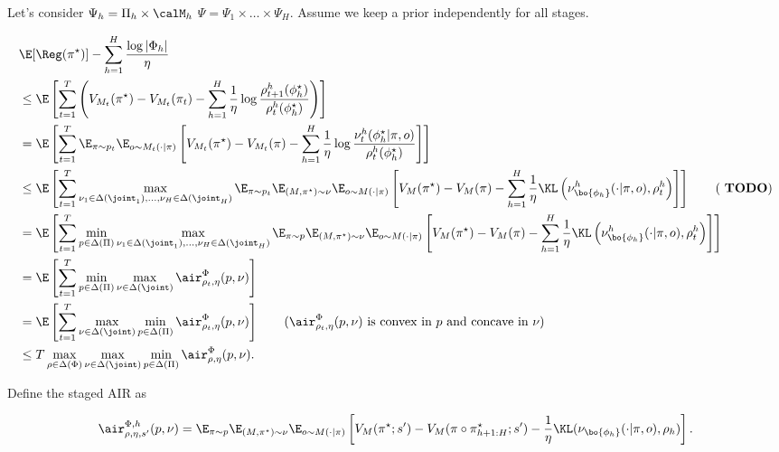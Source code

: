 Let's consider $\Psi_h = \Pi_h\times\calM_h$
$\Psi = \Psi_1\times\dots\times\Psi_H$.
Assume we keep a prior independently for all stages.

\begin{align*}
       &\E[\Reg(\pi^\star)] - \sum_{h=1}^H\frac{\log|\Phi_h|}{\eta} \\
       &\leq \E\left[\sum_{t=1}^T \left(V_{M_t}(\pi^\star) -  V_{M_t}(\pi_t) - \sum_{h=1}^H\frac{1}{\eta}\log\frac{\rho^h_{t+1}(\phi^\star_h)}{\rho^h_t(\phi^\star_h)} \right)\right] \\
       &= \E\left[\sum_{t=1}^T  \E_{\pi\sim p_t} \E_{o\sim M_t(\cdot|\pi)}\left[ V_{M_t}(\pi^\star) -  V_{M_t}(\pi) - \sum_{h=1}^H\frac{1}{\eta} \log\frac{\nu_t^h(\phi^\star_h|\pi, o)}{\rho_t^h(\phi^\star_h)} \right]\right] \\
       &\leq \E\left[ \sum_{t=1}^T  \max_{\nu_1\in\Delta(\joint_1),\dots,\nu_H\in\Delta(\joint_H)} \E_{\pi\sim p_t} \E_{(M,\pi^\star)\sim \nu} \E_{o\sim M(\cdot|\pi)}\left[ V_{M}(\pi^\star) -  V_{M}(\pi) - \sum_{h=1}^H\frac{1}{\eta} \KL\left( \nu^h_{\bo{\phi_h}}(\cdot|\pi, o), \rho^h_t\right) \right]\right]  \tag{ \textbf{TODO}}  \\
       &= \E\left[ \sum_{t=1}^T  \min_{p\in\Delta(\Pi)}\max_{\nu_1\in\Delta(\joint_1),\dots,\nu_H\in\Delta(\joint_H)} \E_{\pi\sim p} \E_{(M,\pi^\star)\sim \nu} \E_{o\sim M(\cdot|\pi)}\left[ V_{M}(\pi^\star) -  V_{M}(\pi) - \sum_{h=1}^H\frac{1}{\eta} \KL\left( \nu^h_{\bo{\phi_h}}(\cdot|\pi, o), \rho_t^h\right) \right]\right] \\
       &= \E\left[ \sum_{t=1}^T  \min_{p\in\Delta(\Pi)}\max_{\nu\in\Delta(\joint)}  
\air^\Phi_{\rho_t,\eta}(p,\nu) \right] \\
       &= \E\left[ \sum_{t=1}^T  \max_{\nu\in\Delta(\joint)}\min_{p\in\Delta(\Pi)}  
\air^\Phi_{\rho_t,\eta}(p,\nu) \right]   \tag{$\air^\Phi_{\rho_t,\eta}(p,\nu)$ is convex in $p$ and concave in $\nu$}  \\
    &\leq  T \max_{\rho \in \Delta(\Phi)}\max_{\nu\in\Delta(\joint)}\min_{p\in\Delta(\Pi)}  
\air^\Phi_{\rho,\eta}(p,\nu). 
    \end{align*}

Define the staged AIR as

\begin{align*}
    \air^{\Phi,h}_{\rho,\eta,s'}(p,\nu) = \E_{\pi\sim p} \E_{(M,\pi^\star)\sim \nu} \E_{o\sim M(\cdot|\pi)}\left[V_M(\pi^\star;s') - V_M(\pi\circ\pi^\star_{h+1:H};s') - \frac{1}{\eta} \KL(\nu_{\bo{\phi_h}}(\cdot|\pi, o), \rho_h)\right]. 
\end{align*}

